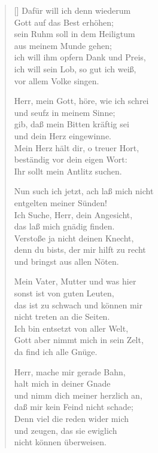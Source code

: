\begin{multicols}{2}
\begin{verse}[\versewidth]
 Dafür will ich denn wiederum\\
Gott auf das Best erhöhen;\\
sein Ruhm soll in dem Heiligtum\\
aus meinem Munde gehen;\\
ich will ihm opfern Dank und Preis,\\
ich will sein Lob, so gut ich weiß,\\
vor allem Volke singen.

 Herr, mein Gott, höre, wie ich schrei\\
und seufz in meinem Sinne;\\
gib, daß mein Bitten kräftig sei\\
und dein Herz eingewinne.\\
Mein Herz hält dir, o treuer Hort,\\
beständig vor dein eigen Wort:\\
Ihr sollt mein Antlitz suchen.

 Nun such ich jetzt, ach laß mich nicht\\
entgelten meiner Sünden!\\
Ich Suche, Herr, dein Angesicht,\\
das laß mich gnädig finden.\\
Verstoße ja nicht deinen Knecht,\\
denn du bists, der mir hilft zu recht\\
und bringst aus allen Nöten.

 Mein Vater, Mutter und was hier\\
sonst ist von guten Leuten,\\
das ist zu schwach und können mir\\
nicht treten an die Seiten.\\
Ich bin entsetzt von aller Welt,\\
Gott aber nimmt mich in sein Zelt,\\
da find ich alle Gnüge.

 Herr, mache mir gerade Bahn,\\
halt mich in deiner Gnade\\
und nimm dich meiner herzlich an,\\
daß mir kein Feind nicht schade;\\
Denn viel die reden wider mich\\
und zeugen, das sie ewiglich\\
nicht können überweisen.

\end{verse}
\end{multicols}

